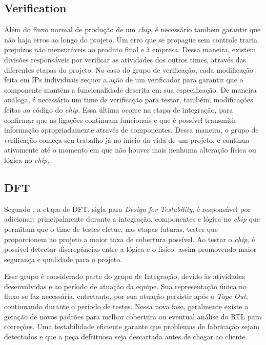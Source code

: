 \documentclass[
	12pt,				%
    oneside,			%
	a4paper,			%
	english,			%
	french,				%
	spanish,			%
	brazil				%
	]{abntex2}
\begin{document}
\subsection{Verification}

Além do fluxo normal de produção de um \textit{chip}, é necessário também garantir que não haja erros ao longo do projeto. Um erro que se propague sem controle traria prejuízos não mensuráveis ao produto final e à empresa. Dessa maneira, existem divisões responsáveis por verificar as atividades dos outros times, através das diferentes etapas do projeto. No caso do grupo de verificação, cada modificação feita em IPs individuais requer a ação de um verificador para garantir que o componente mantém a funcionalidade descrita em sua especificação. De maneira análoga, é necessário um time de verificação para testar, também, modificações feitas ao código do \textit{chip}. Essa última ocorre na etapa de integração, para confirmar que as ligações continuam funcionais e que é possível transmitir informação apropriadamente através de componentes. Dessa maneira, o grupo de verificação começa seu trabalho já no início da vida de um projeto, e continua ativamente até o momento em que não houver mais nenhuma alteração física ou lógica no \textit{chip}.

\subsection{DFT}

Segundo \citeauthor{Laung}, a etapa de DFT, sigla para \textit{Design for Testability}, é responsável por adicionar, principalmente durante a integração, componentes e lógica no \textit{chip} que permitam que o time de testes efetue, nas etapas futuras, testes que proporcionem ao projeto a maior taxa de cobertura possível. Ao testar o \textit{chip}, é possível detectar discrepâncias entre a lógica e o físico. assim promovendo maior segurança e qualidade para o projeto.

Esse grupo é considerado parte do grupo de Integração, devido às atividades desenvolvidas e ao período de atuação da equipe. Sua representação única no fluxo se faz necessária, entretanto, por sua atuação persistir após o \textit{Tape Out}, continuando durante o período de testes. Nessa nova fase, geralmente existe a geração de novos padrões para melhor cobertura ou eventual análise do RTL para correções. Uma testabilidade eficiente garante que problemas de fabricação sejam detectados e que a peça defeituosa seja descartada antes de chegar ao cliente.
\end{document}
